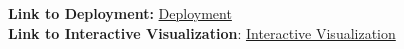\documentclass[11pt]{article}
\begin{document}
\textbf{Link to Deployment:} \href{https://chieri-jn.github.io/A3/}{Deployment}\\
\textbf{Link to Interactive Visualization}:  \href{https://chieri-jn.github.io/A3/}{Interactive Visualization}\\



\label{mylastpagelabel}
\end{document}
